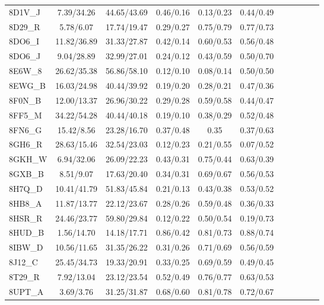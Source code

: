\begin{tabular}{lcccccccccc}
8D1V\_J & 7.39/34.26 & 44.65/43.69 & 0.46/0.16 & 0.13/0.23 & 0.44/0.49 \\
8D29\_R & 5.78/6.07 & 17.74/19.47 & 0.29/0.27 & 0.75/0.79 & 0.77/0.73 \\
8DO6\_I & 11.82/36.89 & 31.33/27.87 & 0.42/0.14 & 0.60/0.53 & 0.56/0.48 \\
8DO6\_J & 9.04/28.89 & 32.99/27.01 & 0.24/0.12 & 0.43/0.59 & 0.50/0.70 \\
8E6W\_8 & 26.62/35.38 & 56.86/58.10 & 0.12/0.10 & 0.08/0.14 & 0.50/0.50 \\
8EWG\_B & 16.03/24.98 & 40.44/39.92 & 0.19/0.20 & 0.28/0.21 & 0.47/0.36 \\
8F0N\_B & 12.00/13.37 & 26.96/30.22 & 0.29/0.28 & 0.59/0.58 & 0.44/0.47 \\
8FF5\_M & 34.22/54.28 & 40.44/40.18 & 0.19/0.10 & 0.38/0.29 & 0.52/0.48 \\
8FN6\_G & 15.42/8.56 & 23.28/16.70 & 0.37/0.48 & 0.35 & 0.37/0.63 \\
8GH6\_R & 28.63/15.46 & 32.54/23.03 & 0.12/0.23 & 0.21/0.55 & 0.07/0.52 \\
8GKH\_W & 6.94/32.06 & 26.09/22.23 & 0.43/0.31 & 0.75/0.44 & 0.63/0.39 \\
8GXB\_B & 8.51/9.07 & 17.63/20.40 & 0.34/0.31 & 0.69/0.67 & 0.56/0.53 \\
8H7Q\_D & 10.41/41.79 & 51.83/45.84 & 0.21/0.13 & 0.43/0.38 & 0.53/0.52 \\
8HB8\_A & 11.87/13.77 & 22.12/23.67 & 0.28/0.26 & 0.59/0.48 & 0.36/0.33 \\
8HSR\_R & 24.46/23.77 & 59.80/29.84 & 0.12/0.22 & 0.50/0.54 & 0.19/0.73 \\
8HUD\_B & 1.56/14.70 & 14.18/17.71 & 0.86/0.42 & 0.81/0.73 & 0.88/0.74 \\
8IBW\_D & 10.56/11.65 & 31.35/26.22 & 0.31/0.26 & 0.71/0.69 & 0.56/0.59 \\
8J12\_C & 25.45/34.73 & 19.33/20.91 & 0.33/0.25 & 0.69/0.59 & 0.49/0.45 \\
8T29\_R & 7.92/13.04 & 23.12/23.54 & 0.52/0.49 & 0.76/0.77 & 0.63/0.53 \\
8UPT\_A & 3.69/3.76 & 31.25/31.87 & 0.68/0.60 & 0.81/0.78 & 0.72/0.67 \\
\bottomrule
\end{tabular}
